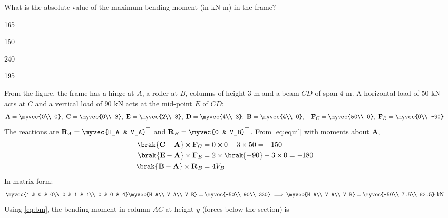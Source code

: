 \begin{enumerate}[label=1.2.\arabic*,leftmargin=*,labelsep=0.8em,itemsep=2ex]
What is the absolute value of the maximum bending moment (in kN-m) in the frame? \gate
\begin{options}
\item 165
\item 150
\item 240
\item 195
\end{options}
\solution From the figure, the frame has a hinge at $A$, a roller at $B$, columns of height 3 m and a beam $CD$ of span 4 m. A horizontal load of 50 kN acts at $C$ and a vertical load of 90 kN acts at the mid-point $E$ of $CD$:
\begin{align}
\mathbf{A} = \myvec{0\\ 0},\ \mathbf{C} = \myvec{0\\ 3},\ \mathbf{E} = \myvec{2\\ 3},\ \mathbf{D} = \myvec{4\\ 3},\ \mathbf{B} = \myvec{4\\ 0},\quad \mathbf{F}_C = \myvec{50\\ 0},\ \mathbf{F}_E = \myvec{0\\ -90}
\end{align}
The reactions are $\mathbf{R}_A = \myvec{H_A & V_A}^\top$ and $\mathbf{R}_B = \myvec{0 & V_B}^\top$. From \eqref{eq:equil} with moments about $\mathbf{A}$,
\begin{align}
\brak{\mathbf{C}-\mathbf{A}}\times\mathbf{F}_C &= 0\times 0 - 3\times 50 = -150\\
\brak{\mathbf{E}-\mathbf{A}}\times\mathbf{F}_E &= 2\times\brak{-90} - 3\times 0 = -180\\
\brak{\mathbf{B}-\mathbf{A}}\times\mathbf{R}_B &= 4V_B
\end{align}
In matrix form:
\begin{align}
\myvec{1 & 0 & 0\\ 0 & 1 & 1\\ 0 & 0 & 4}\myvec{H_A\\ V_A\\ V_B} = \myvec{-50\\ 90\\ 330} \implies \myvec{H_A\\ V_A\\ V_B} = \myvec{-50\\ 7.5\\ 82.5}\text{ kN}
\end{align}
Using \eqref{eq:bm}, the bending moment in column $AC$ at height $y$ (forces below the section) is
\begin{align}

\end{align}
\end{enumerate}
